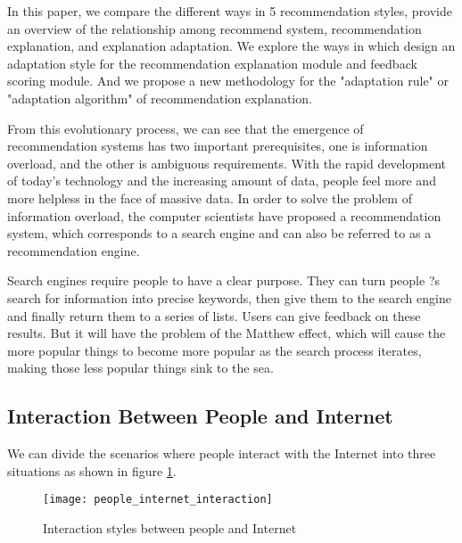 \par In this paper, we compare the different ways in 5 recommendation styles, provide an overview of the relationship among recommend system, recommendation explanation, and explanation adaptation. We explore the ways in which design an adaptation style for the recommendation explanation module and feedback scoring module. And we propose a new methodology for the "adaptation rule" or "adaptation algorithm" of recommendation explanation.
\par From this evolutionary process, we can see that the emergence of recommendation systems has two important prerequisites, one is information overload, and the other is ambiguous requirements. With the rapid development of today's technology and the increasing amount of data, people feel more and more helpless in the face of massive data. In order to solve the problem of information overload, the computer scientists have proposed a recommendation system, which corresponds to a search engine and can also be referred to as a recommendation engine.
\par Search engines require people to have a clear purpose. They can turn people ?s search for information into precise keywords, then give them to the search engine and finally return them to a series of lists. Users can give feedback on these results. But it will have the problem of the Matthew effect, which will cause the more popular things to become more popular as the search process iterates, making those less popular things sink to the sea.
\par 
\subsection{Interaction Between People and Internet}
We can divide the scenarios where people interact with the Internet into three situations as shown in figure \ref{figure:1-1}.

\begin{figure}[h]
\caption{Interaction styles between people and Internet}
\label{figure:1-1}
\centering
\texttt{[image: people\_internet\_interaction]}
\end{figure}

